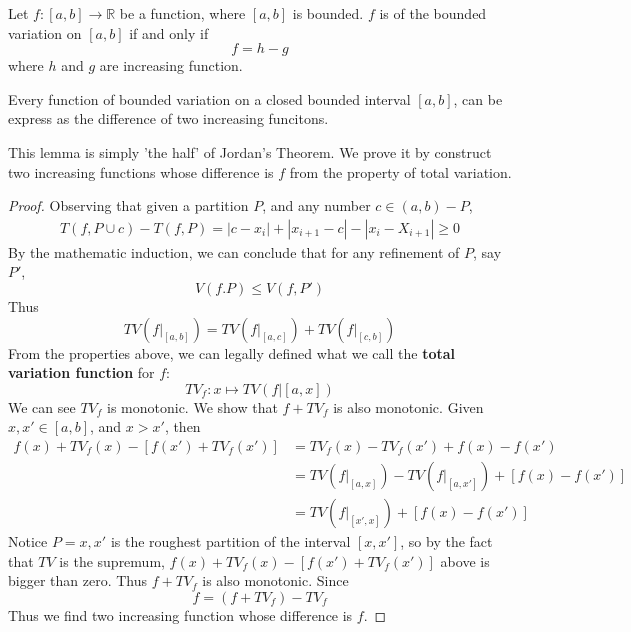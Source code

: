 \documentclass[lang=en, 12pt]{elegantbook}
\newcommand{\RR}{\mathbb{R}}
\begin{document}
        \begin{theorem}
            Let $f:[a,b] \to \RR$ be a function, where $[a,b]$ is bounded. $f$ is of the bounded variation on $[a,b]$ if and only if $$f = h - g$$ where $h$ and $g$
        are increasing function.
        \end{theorem} 
        \begin{lemma}
            Every function of bounded variation on a closed bounded interval $[a,b]$, can be express as the difference of two increasing
        funcitons. 
        \end{lemma}
            This lemma is simply 'the half' of Jordan's Theorem. We prove it by construct two increasing functions whose difference 
        is $f$ from the property of total variation.
        \begin{proof}
            Observing that given a partition $P$, and any number $c \in (a,b)- P$, 
            \begin{equation*}
                \begin{aligned}
                    T(f,P \cup {c})- T(f,P) = |c - x_i|+|x_{i+1}-c|-|x_i-X_{i+1}| \geq 0
                \end{aligned}
            \end{equation*}
            By the mathematic induction, we can conclude that for any refinement of $P$, say $P'$,
            $$V(f.P)\leq V(f,P')$$
            Thus 
            $$TV(f|_{[a,b]}) = TV(f|_{[a,c]})+TV(f|_{[c,b]})$$
            From the properties above, we can legally defined what we call the \textbf{total variation function }for $f$:
            \begin{equation}
                TV_f : x \mapsto TV(f|[a,x])
            \end{equation}
            We can see $TV_f$ is monotonic. We show that $f+TV_f$ is also monotonic. Given $x ,x' \in [a,b]$, and $x>x'$, then 
            \begin{equation*}
                \begin{aligned}
                    f(x) +TV_f(x) - [f(x')+TV_f(x')] &= TV_f(x) - TV_f(x')  + f(x) - f(x')\\
                    &= TV(f|_{[a,x]}) - TV(f|_{[a,x']}) + [f(x) - f(x')]\\
                    &= TV(f|_{[x',x]}) +[f(x) - f(x')]
                \end{aligned}
            \end{equation*}
            Notice $P={x,x'}$ is the roughest partition of the interval $[x,x']$, so by the fact that $TV$ is the supremum, $f(x) +TV_f(x) - [f(x')+TV_f(x')]$
            above is bigger than zero. Thus $f+TV_f$ is also monotonic. Since  
            $$f = (f +TV_f) - TV_f$$
            Thus we find two increasing function whose difference is $f$.
        \end{proof}
\end{document}
